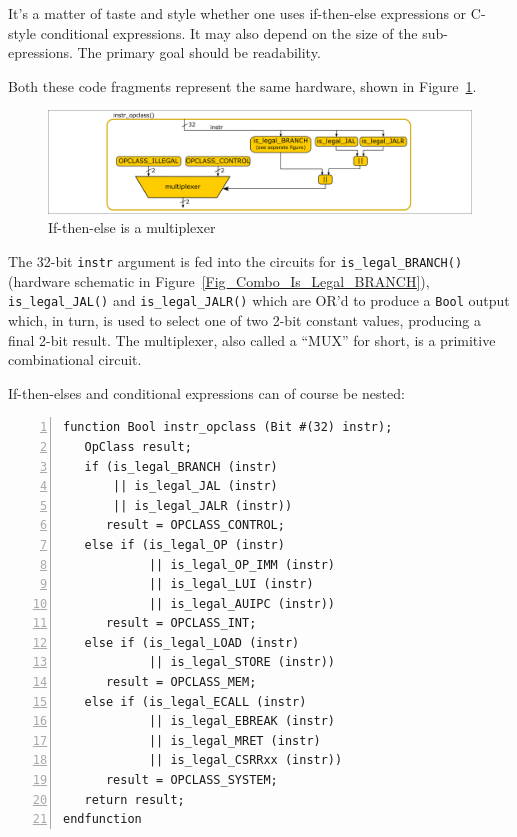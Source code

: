 It's a matter of taste and style whether one uses if-then-else
expressions or C-style conditional expressions.  It may also depend on
the size of the sub-epressions.  The primary goal should be
readability.

Both these code fragments represent the same hardware, shown in
Figure~\ref{Fig_Combo_Multiplexer}.
\begin{figure}[htbp]
  \centerline{\includegraphics[width=6in,angle=0]{Figures/Fig_Combo_Multiplexer}}
  \caption{\label{Fig_Combo_Multiplexer}If-then-else is a multiplexer}
\end{figure}
The 32-bit \verb|instr| argument is fed into the circuits for
\verb|is_legal_BRANCH()| (hardware schematic in
Figure~\ref{Fig_Combo_Is_Legal_BRANCH}), \verb|is_legal_JAL()| and
\verb|is_legal_JALR()| which are OR'd to produce a \verb|Bool| output
which, in turn, is used to select one of two 2-bit constant values,
producing a final 2-bit result.  The multiplexer, also called a
``MUX'' for short, is a primitive combinational circuit.

If-then-elses and conditional expressions can of course be nested:


{\footnotesize
\begin{Verbatim}[frame=single, numbers=left]
function Bool instr_opclass (Bit #(32) instr);
   OpClass result;
   if (is_legal_BRANCH (instr)
       || is_legal_JAL (instr)
       || is_legal_JALR (instr))
      result = OPCLASS_CONTROL;
   else if (is_legal_OP (instr)
            || is_legal_OP_IMM (instr)
            || is_legal_LUI (instr)
            || is_legal_AUIPC (instr))
      result = OPCLASS_INT;
   else if (is_legal_LOAD (instr)
            || is_legal_STORE (instr))
      result = OPCLASS_MEM;
   else if (is_legal_ECALL (instr)
            || is_legal_EBREAK (instr)
            || is_legal_MRET (instr)
            || is_legal_CSRRxx (instr))
      result = OPCLASS_SYSTEM;
   return result;
endfunction
\end{Verbatim}
}

